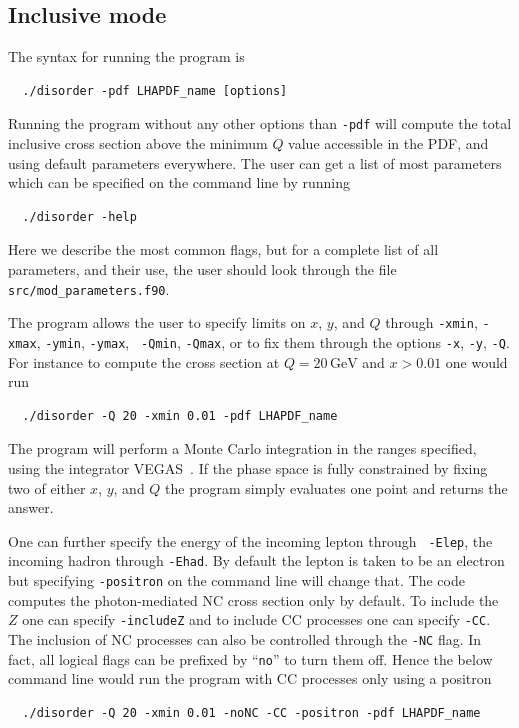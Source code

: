\documentclass[submission, PhysCodeb]{SciPost}
\newcommand{\GEV}{\,\mathrm{GeV}}
\begin{document}
\subsection{Inclusive mode}
\label{sec:Inclusive}
The syntax for running the program is
\begin{lstlisting}
  ./disorder -pdf LHAPDF_name [options]
\end{lstlisting}
Running the program without any other options than {\tt -pdf} will
compute the total inclusive cross section above the minimum $Q$ value
accessible in the PDF, and using default parameters everywhere. The
user can get a list of most parameters which can be specified on the
command line by running
\begin{lstlisting}
  ./disorder -help
\end{lstlisting}
Here we describe the most common flags, but for a complete list of all
parameters, and their use, the user should look through the file {\tt
  src/mod\_parameters.f90}.

The program allows the user to specify limits on $x$, $y$, and $Q$
through {\tt -xmin}, {\tt -xmax}, {\tt -ymin}, {\tt -ymax}, {\tt
  -Qmin}, {\tt -Qmax}, or to fix them through the options {\tt -x},
{\tt -y}, {\tt -Q}. For instance to compute the cross section at $Q=20
\GEV$ and $x>0.01$ one would run
\begin{lstlisting}
  ./disorder -Q 20 -xmin 0.01 -pdf LHAPDF_name
\end{lstlisting}
The program will perform a Monte Carlo integration in the ranges
specified, using the integrator VEGAS~\cite{Lepage:1977sw}. If the
phase space is fully constrained by fixing two of either $x$, $y$, and
$Q$ the program simply evaluates one point and returns the answer.

One can further specify the energy of the incoming lepton through {\tt
  -Elep}, the incoming hadron through {\tt -Ehad}. By default the
lepton is taken to be an electron but specifying {\tt -positron} on
the command line will change that. The code computes the
photon-mediated NC cross section only by default. To include the $Z$
one can specify {\tt -includeZ} and to include CC processes one can
specify {\tt -CC}. The inclusion of NC processes can also be
controlled through the {\tt -NC} flag. In fact, all logical flags can
be prefixed by ``{\tt{no}}'' to turn them off. Hence the below command
line would run the program with CC processes only using a positron
\begin{lstlisting}
  ./disorder -Q 20 -xmin 0.01 -noNC -CC -positron -pdf LHAPDF_name
\end{lstlisting}
\end{document}
